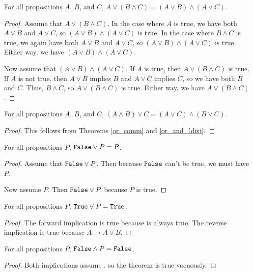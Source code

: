 \documentclass[../../math.tex]{subfiles}
\begin{document}
\begin{theorem} \label{or_and_ldist}
    For all propositions $A$, $B$, and $C$, $A \vee (B \wedge C) = (A \vee B)
    \wedge (A \vee C)$.
\end{theorem}
\begin{proof}
    Assume that $A \vee (B \wedge C)$.  In the case where $A$ is true, we have
    both $A \vee B$ and $A \vee C$, so $(A \vee B) \wedge (A \vee C)$ is true.
    In the case where $B \wedge C$ is true, we again have both $A \vee B$ and $A
    \vee C$, so $(A \vee B) \wedge (A \vee C)$ is true.  Either way, we have $(A
    \vee B) \wedge (A \vee C)$.

    Now assume that $(A \vee B) \wedge (A \vee C)$.  If $A$ is true, then $A
    \vee (B \wedge C)$ is true.  If $A$ is not true, then $A \vee B$ implies
    $B$ and $A \vee C$ implies $C$, so we have both $B$ and $C$.  Thus, $B
    \wedge C$, so $A \vee (B \wedge C)$ is true.  Either way, we have $A \vee (B
    \wedge C)$.
\end{proof}

\begin{theorem} \label{or_and_rdist}
    For all propositions $A$, $B$, and $C$, $(A \wedge B) \vee C = (A \vee C)
    \wedge (B \vee C)$.
\end{theorem}
\begin{proof}
    This follows from Theorems \ref{or_comm} and \ref{or_and_ldist}.
\end{proof}

\begin{theorem} \label{or_lfalse}
    For all propositions $P$, $\vtt{False} \vee P = P$.
\end{theorem}
\begin{proof}
    Assume that $\vtt{False} \vee P$.  Then because $\vtt{False}$ can't be true,
    we must have $P$.

    Now assume $P$.  Then $\vtt{False} \vee P$ because $P$ is true.
\end{proof}

\begin{theorem} \label{or_ltrue}
    For all propositions $P$, $\vtt{True} \vee P = \vtt{True}$.
\end{theorem}
\begin{proof}
    The forward implication is true because  is always true.  The
    reverse implication is true because $A \rightarrow A \vee B$.
\end{proof}

\begin{theorem} \label{and_lfalse}
    For all propositions $P$, $\vtt{False} \wedge P = \vtt{False}$.
\end{theorem}
\begin{proof}
    Both implications assume , so the theorem is true vacuously.
\end{proof}
\end{document}
